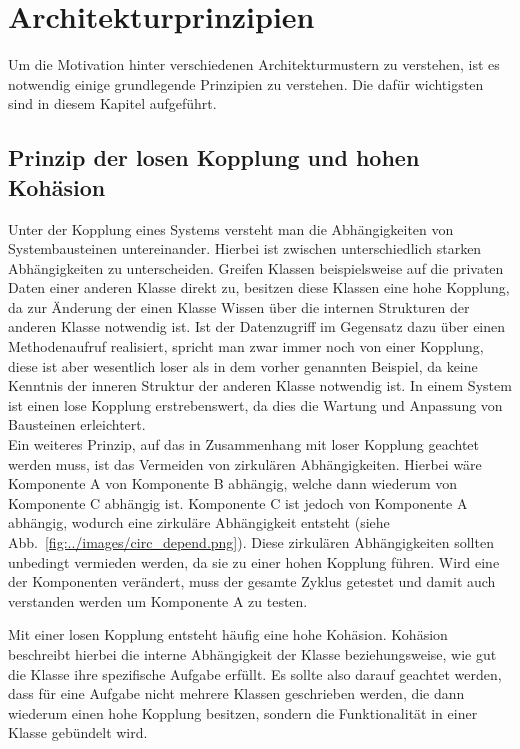 \section{Architekturprinzipien} %
\label{sec:Architektur_Prinzipien}
Um die Motivation hinter verschiedenen Architekturmustern zu verstehen, ist es notwendig einige grundlegende Prinzipien zu verstehen.
Die dafür wichtigsten sind in diesem Kapitel aufgeführt.

\subsection{Prinzip der losen Kopplung und hohen Kohäsion} %
\label{sub:Prinzip_der_loosen_Kopplung_und_hohen_Kohäsion}
Unter der Kopplung eines Systems versteht man die Abhängigkeiten von Systembausteinen untereinander.
Hierbei ist zwischen unterschiedlich starken Abhängigkeiten zu unterscheiden.
Greifen Klassen beispielsweise auf die privaten Daten einer anderen Klasse direkt zu, besitzen diese Klassen eine hohe Kopplung, da zur Änderung der einen Klasse Wissen über die internen Strukturen der anderen Klasse notwendig ist.
Ist der Datenzugriff im Gegensatz dazu über einen Methodenaufruf realisiert, spricht man zwar immer noch von einer Kopplung, diese ist aber wesentlich loser als in dem vorher genannten Beispiel, da keine Kenntnis der inneren Struktur der anderen Klasse notwendig ist.
In einem System ist einen lose Kopplung erstrebenswert, da dies die Wartung und Anpassung von Bausteinen erleichtert.~\cite{softArchGrundl}\\
Ein weiteres Prinzip, auf das in Zusammenhang mit loser Kopplung geachtet werden muss, ist das Vermeiden von zirkulären Abhängigkeiten.
Hierbei wäre Komponente A von Komponente B abhängig, welche dann wiederum von Komponente C abhängig ist.
Komponente C ist jedoch von Komponente A abhängig, wodurch eine zirkuläre Abhängigkeit entsteht (siehe Abb.~\ref{fig:../images/circ_depend.png}).
Diese zirkulären Abhängigkeiten sollten unbedingt vermieden werden, da sie zu einer hohen Kopplung führen.
Wird eine der Komponenten verändert, muss der gesamte Zyklus getestet und damit auch verstanden werden um Komponente A zu testen.


Mit einer losen Kopplung entsteht häufig eine hohe Kohäsion.
Kohäsion beschreibt hierbei die interne Abhängigkeit der Klasse beziehungsweise, wie gut die Klasse ihre spezifische Aufgabe erfüllt.
Es sollte also darauf geachtet werden, dass für eine Aufgabe nicht mehrere Klassen geschrieben werden, die dann wiederum einen hohe Kopplung besitzen, sondern die Funktionalität in einer Klasse gebündelt wird.~\cite{softArchGrundl}

